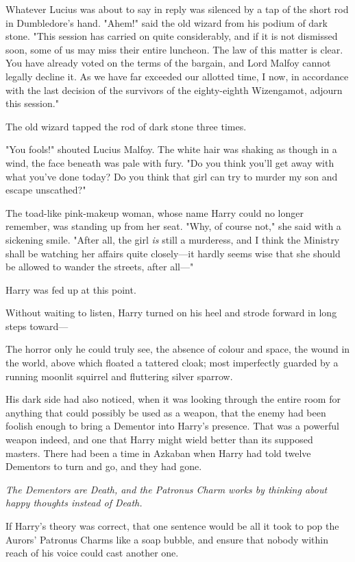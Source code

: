 Whatever Lucius was about to say in reply was silenced by a tap of the short
rod in Dumbledore's hand. "Ahem!" said the old wizard from his podium of dark
stone. "This session has carried on quite considerably, and if it is not
dismissed soon, some of us may miss their entire luncheon. The law of this
matter is clear. You have already voted on the terms of the bargain, and Lord
Malfoy cannot legally decline it. As we have far exceeded our allotted time, I
now, in accordance with the last decision of the survivors of the eighty-eighth
Wizengamot, adjourn this session."

The old wizard tapped the rod of dark stone three times.

"You fools!" shouted Lucius Malfoy. The white hair was shaking as though in a
wind, the face beneath was pale with fury. "Do you think you'll get away with
what you've done today? Do you think that girl can try to murder my son and
escape unscathed?"

The toad-like pink-makeup woman, whose name Harry could no longer remember, was
standing up from her seat. "Why, of course not," she said with a sickening
smile. "After all, the girl \emph{is} still a murderess, and I think the
Ministry shall be watching her affairs quite closely---it hardly seems wise
that she should be allowed to wander the streets, after all---"

Harry was fed up at this point.

Without waiting to listen, Harry turned on his heel and strode forward in long
steps toward---

The horror only he could truly see, the absence of colour and space, the wound
in the world, above which floated a tattered cloak; most imperfectly guarded by
a running moonlit squirrel and fluttering silver sparrow.

His dark side had also noticed, when it was looking through the entire room for
anything that could possibly be used as a weapon, that the enemy had been
foolish enough to bring a Dementor into Harry's presence. That was a powerful
weapon indeed, and one that Harry might wield better than its supposed masters.
There had been a time in Azkaban when Harry had told twelve Dementors to turn
and go, and they had gone.

\emph{The Dementors are Death, and the Patronus Charm works by thinking about
happy thoughts instead of Death.}

If Harry's theory was correct, that one sentence would be all it took to pop
the Aurors' Patronus Charms like a soap bubble, and ensure that nobody within
reach of his voice could cast another one.

